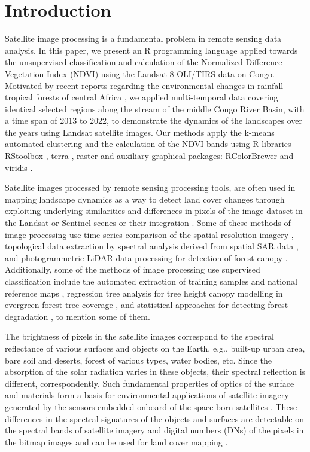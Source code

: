 \documentclass[applsci,article,submit,pdftex,moreauthors]{Definitions/mdpi}
\begin{document}
\section{Introduction}
Satellite image processing is a fundamental problem in remote sensing data analysis. In this paper, we present an R programming language \cite{RCoreTeam} applied towards the unsupervised classification and calculation of the Normalized Difference Vegetation Index (NDVI) using the Landsat-8 OLI/TIRS data on Congo. Motivated by recent reports regarding the environmental changes in rainfall tropical forests of central Africa \cite{Wasseige,lescuyer2010chainsaw,Jayathilake,POTAPOV2012106,Shapiro,7326202}, we applied multi-temporal data covering identical selected regions along the stream of the middle Congo River Basin, with a time span of 2013 to 2022, to demonstrate the dynamics of the landscapes over the years using Landsat satellite images. Our methods apply the k-means automated clustering and the calculation of the NDVI bands using R libraries RStoolbox \cite{RStoolbox}, terra \cite{RTerra}, raster \cite{Hijmans} and auxiliary graphical packages: RColorBrewer \cite{Neuwirth} and viridis \cite{viridis}. 

Satellite images processed by remote sensing processing tools, are often used in mapping landscape dynamics as a way to detect land cover changes through exploiting underlying similarities and differences in pixels of the image dataset in the Landsat \cite{SIKUZANI2020e01333,DUVEILLER20081969} or Sentinel scenes \cite{9554698,Lemenkova202021,9553905} or their integration \cite{ZHANG2021112470,CHEN2021102386}. Some of these methods of image processing use time series comparison of the spatial resolution imagery \cite{7326202,6352722}, topological data extraction by spectral analysis derived from spatial SAR data \cite{1027205,520569}, and photogrammetric LiDAR data processing for detection of forest canopy \cite{rs13183777}. Additionally, some of the methods of image processing use supervised classification include the automated extraction of training samples and national reference maps \cite{rs12172705}, regression tree analysis for tree height canopy modelling in evergreen forest tree coverage \cite{HANSEN2016221}, and statistical approaches for detecting forest degradation \cite{7326141}, to mention some of them.

The brightness of pixels in the satellite images correspond to the spectral reflectance of various surfaces and objects on the Earth, e.g., built-up urban area, bare soil and deserts, forest of various types, water bodies, etc. Since the absorption of the solar radiation varies in these objects, their spectral reflection is different, correspondently. Such fundamental properties of optics of the surface and materials form a basis for environmental applications of satellite imagery generated by the sensors embedded onboard of the space born satellites \cite{Lillesand}. These differences in the spectral signatures of the objects and surfaces are detectable on the spectral bands of satellite imagery and digital numbers (DNs) of the pixels in the bitmap images and can be used for land cover mapping \cite{Manakos}. 
\end{document}
